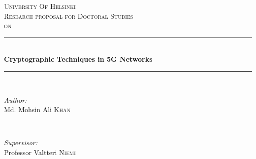 \documentclass[14pt]{article}
\begin{document}
\begin{titlepage}



\newcommand{\HRule}{\rule{\linewidth}{0.5mm}} %

\center %
 

\textsc{\LARGE University Of Helsinki}\\[1.5cm] %
\textsc{\Large Research proposal for Doctoral Studies}\\[0.5cm] %
\textsc{\large on}\\[0.5cm] %


\HRule \\[0.4cm]
{ \huge \bfseries Cryptographic Techniques in 5G Networks}\\[0.4cm] %
\HRule \\[1.5cm]
 

\begin{minipage}{0.4\textwidth}
\begin{flushleft} \large
\emph{Author:}\\
Md. Mohsin Ali \textsc{Khan} %
\end{flushleft}
\end{minipage}
~
\begin{minipage}{0.4\textwidth}
\begin{flushright} \large
\emph{Supervisor:} \\
Professor Valtteri \textsc{Niemi} %
\end{flushright}
\end{minipage}\\[4cm]



\end{titlepage}
\end{document}

